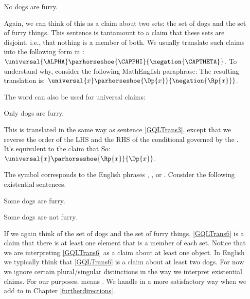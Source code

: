 \begin{menumerate}
	\item\label{GQLTrans4} No dogs are furry.
\end{menumerate}

\noindent{}Again, we can think of this as a claim about two sets: the set of dogs and the set of furry things.
This sentence is tantamount to a claim that these sets are disjoint, i.e., that nothing is a member of both.
We usually translate such claims into the following form in \GQL{}: $\universal{\ALPHA}\parhorseshoe{\CAPPHI}{\negation{\CAPTHETA}}$.
To understand why, consider the following MathEnglish paraphrase: 
The resulting translation is: $\universal{\variable{x}}\parhorseshoe{\Dp{\variable{x}}}{\negation{\Rp{\variable{x}}}}$.

The word  can also be used for universal claims:

\begin{menumerate}
	\item\label{GQLTrans5} Only dogs are furry.
\end{menumerate}

\noindent{}This is translated in the same way as sentence \ref{GQLTrans3}, except that we reverse the order of the LHS and the RHS of the conditional governed by the \mention{$\forall$}.
It's equivalent to the claim that 
So: $\universal{\variable{x}}\parhorseshoe{\Rp{\variable{x}}}{\Dp{\variable{x}}}$.

The \GQL{} symbol \mention{$\exists$} corresponds to the English phrases , , or .
Consider the following existential sentences.

\begin{menumerate}
	\item\label{GQLTrans6} Some dogs are furry.
	\item\label{GQLTrans7} Some dogs are not furry.
\end{menumerate}

\noindent{}If we again think of the set of dogs and the set of furry things, \ref{GQLTrans6} is a claim that there is at least one element that is a member of each set.
Notice that we are interpreting \ref{GQLTrans6} as a claim about at least one object.
In English we typically think that \ref{GQLTrans6} is a claim about at least two dogs.
For now we ignore certain plural/singular distinctions in the way we interpret existential claims.
For our purposes,  means .
We handle  in a more satisfactory way when we add to \GQL{} in Chapter \ref{furtherdirections}.

